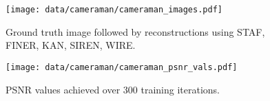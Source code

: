 \begin{figure}[t]
    \centering
    \texttt{[image: data/cameraman/cameraman\_images.pdf]}
    \vspace{-1em}
    \caption{Ground truth image followed by reconstructions using STAF, FINER, KAN, SIREN, WIRE.}
    \label{fig:gt_representations}
\end{figure}
\begin{figure}[t]
    \centering
    \texttt{[image: data/cameraman/cameraman\_psnr\_vals.pdf]}
    \vspace{-1em}
    \caption{PSNR values achieved over 300 training iterations.}
    \vspace{-1em}
    \label{fig:psnr_curve}
\end{figure}

